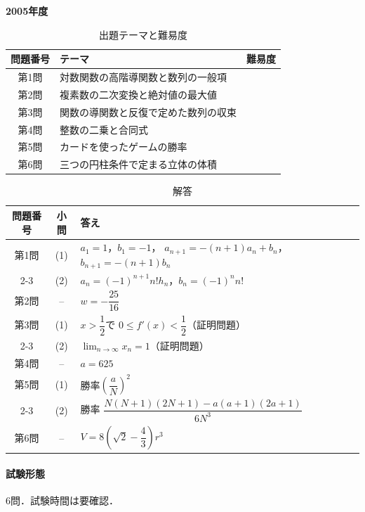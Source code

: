 \documentclass[../../main.tex]{subfiles}
\begin{document}
\begin{center}
  {\fontsize{48pt}{58pt}\selectfont \textbf{2005}\normalsize\textbf{年度}}
\end{center}

\begin{table}[htb]
  \centering
  \caption{出題テーマと難易度}
  \begin{tabular}{|c|p{9cm}|c|}
    \hline
    \textbf{問題番号} & \textbf{テーマ} & \textbf{難易度} \\
    \hline
    第1問 & 対数関数の高階導関数と数列の一般項 & \\
    \hline
    第2問 & 複素数の二次変換と絶対値の最大値 & \\
    \hline
    第3問 & 関数の導関数と反復で定めた数列の収束 & \\
    \hline
    第4問 & 整数の二乗と合同式 & \\
    \hline
    第5問 & カードを使ったゲームの勝率 & \\
    \hline
    第6問 & 三つの円柱条件で定まる立体の体積 & \\
    \hline
  \end{tabular}
\end{table}

\begin{table}[htb]
  \centering
  \caption{解答}
  \renewcommand{\arraystretch}{1.4}
  \begin{tabular}{|c|c|p{9cm}|}
    \hline
    \textbf{問題番号} & \textbf{小問} & \textbf{答え} \\
    \hline
    第1問 & (1) & $a_1=1$，$b_1=-1$，
    $a_{n+1}=-(n+1)a_n+b_n$，$b_{n+1}=-(n+1)b_n$ \\
    \cline{2-3}
    & (2) & $a_n=(-1)^{n+1}n!h_n$，$b_n=(-1)^n n!$ \\
    \hline
    第2問 & -- & $w=-\dfrac{25}{16}$ \\
    \hline
    第3問 & (1) & $x>\dfrac{1}{2}$で
    $0\le f'(x)<\dfrac{1}{2}$（証明問題） \\
    \cline{2-3}
    & (2) & $\displaystyle\lim_{n\to\infty}x_n=1$（証明問題） \\
    \hline
    第4問 & -- & $a=625$ \\
    \hline
    第5問 & (1) & 勝率$\left(\dfrac{a}{N}\right)^2$ \\
    \cline{2-3}
    & (2) & 勝率
    $\dfrac{N(N+1)(2N+1)-a(a+1)(2a+1)}{6N^3}$ \\
    \hline
    第6問 & -- & $V=8\left(\sqrt{2}-\dfrac{4}{3}\right)r^3$ \\
    \hline
  \end{tabular}
\end{table}

\paragraph{試験形態}
6問．試験時間は要確認．
\end{document}
